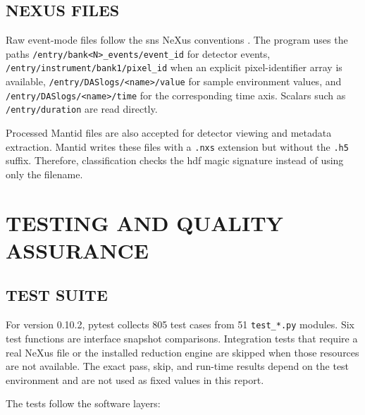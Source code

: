 \documentclass[tm]{ornltm}
\begin{document}
\subsection{NEXUS FILES}

Raw event-mode files follow the \ac{sns} NeXus conventions
\autocite{nexus}. The program uses the paths
\texttt{/entry/bank<N>\_events/event\_id} for detector events,
\texttt{/entry/instrument/bank1/pixel\_id} when an explicit pixel-identifier
array is available,
\texttt{/entry/DASlogs/<name>/value} for sample environment values, and
\texttt{/entry/DASlogs/<name>/time} for the corresponding time axis. Scalars such
as \texttt{/entry/duration} are read directly.

Processed Mantid files are also accepted for detector viewing and metadata
extraction. Mantid writes these files with a \texttt{.nxs} extension but without
the \texttt{.h5} suffix. Therefore, classification checks the \ac{hdf} magic
signature instead of using only the filename.

\section{TESTING AND QUALITY ASSURANCE}
\label{sec:test}

\subsection{TEST SUITE}

For version 0.10.2, pytest collects 805 test cases from 51
\texttt{test\_*.py} modules. Six test functions are interface snapshot
comparisons. Integration tests that require a real NeXus file or the installed
reduction engine are skipped when those resources are not available. The exact
pass, skip, and run-time results depend on the test environment and are not used
as fixed values in this report.

The tests follow the software layers:
\end{document}
